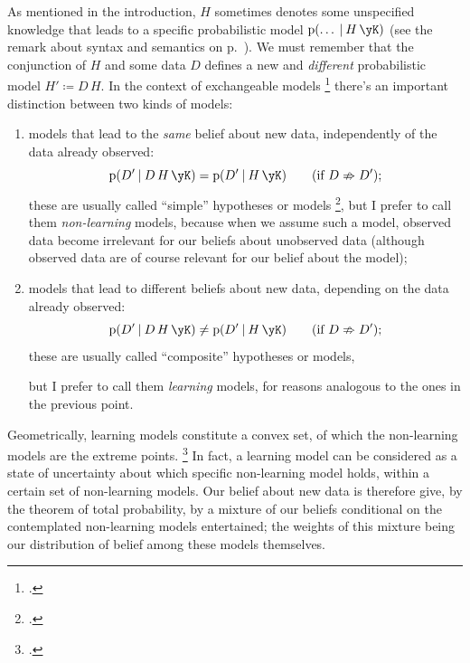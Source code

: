 \documentclass[\ifafour a4paper,12pt,\else a5paper,10pt,\fi%
onecolumn,oneside,article,%
british%
]{memoir}
\theoremstyle{remark}
\theoremstyle{innote}
\newcommand*{\citep}{\footcites}
\newcommand*{\defd}{\coloneqq}
\newcommand*{\p}{\mathrm{p}}%
\renewcommand*{\|}[1][]{\nonscript\:#1\vert\nonscript\:\mathopen{}}
\renewcommand*{\=}{\TextOrMath\texteq\eq}
\newcommand*{\sect}{\S}%
\begin{document}
As mentioned in the introduction, $H$ sometimes denotes some unspecified
knowledge that leads to a specific probabilistic model
$\p(\dotso \| H \, \yK)$ (see the remark about syntax and semantics on
p.~\pageref{note:syntax}). We must remember that the conjunction of $H$ and
some data $D$  defines a new and \emph{different} probabilistic model
$H' \defd D \, H$. In the context of exchangeable models
\citep[\sect~4.2]{bernardoetal1994_r2000}{dawid2013,definetti1937,kingman1978,kochetal1982}[see
also][]{diaconisetal1980} there's an important distinction between two
kinds of models:
\begin{enumerate}[label=(\alph*)]
\item models that lead to the \emph{same} belief about new data,
  independently of the data already observed:
  \begin{equation}
  \label{eq:irrelevance_data}
  \p(D' \| D \, H \, \yK) = \p(D' \| H \, \yK)
  \qquad\text{(if $D \nRightarrow D'$)};
\end{equation}
these are usually called \enquote{simple} hypotheses or models
\citep[\sect~6.1.4]{bernardoetal1994_r2000}, but I prefer to call them
\emph{non-learning} models, because when we assume such a model, observed
data become irrelevant for our beliefs about unobserved data (although
observed data are of course relevant for our belief about the model);
\item models that lead to different beliefs about new data, depending on
  the data already observed:
  \begin{equation}
  \label{eq:irrelevance_data}
  \p(D' \| D \, H \, \yK) \ne \p(D' \| H \, \yK)
  \qquad\text{(if $D \nRightarrow D'$)};
\end{equation}
these are usually called \enquote{composite} hypotheses or models,\addtocounter{footnote}{-1}\footnotemark{}%
but I prefer to call them \emph{learning} models, for reasons analogous to
the ones in the previous point.
\end{enumerate}
Geometrically, learning models constitute a convex set, of which the
non-learning models are the extreme points.
\footcites{lauritzen1974,lauritzen1982_r1988,lauritzen1984,barndorffnielsen1978_r2014,dynkin1978}[gives
a terse summary]{dawid2013} In fact, a learning model can be considered as
a state of uncertainty about which specific non-learning model holds,
within a certain set of non-learning models. Our belief about new data is
therefore give, by the theorem of total probability, by a mixture of our
beliefs conditional on the contemplated non-learning models entertained;
the weights of this mixture being our distribution of belief among these
models themselves. 
\end{document}
